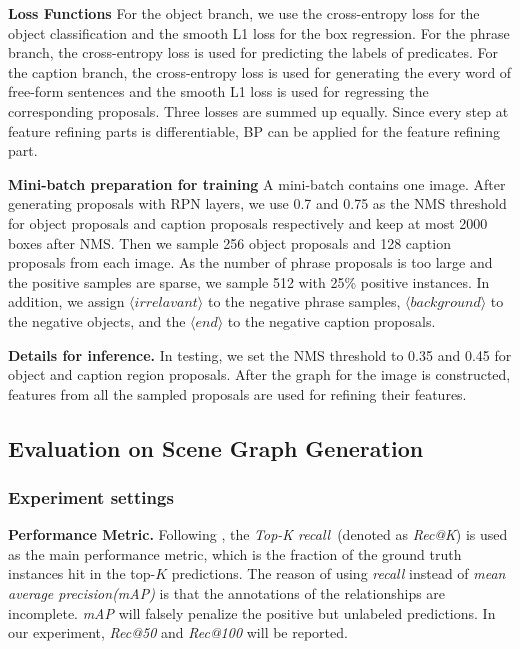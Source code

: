 \textbf{Loss Functions}
For the object branch, we use the cross-entropy loss for the object classification and the smooth L1 loss for the box regression. For the phrase branch, the cross-entropy loss is used for predicting the labels of predicates. For the caption branch, the cross-entropy loss is used for generating the every word of free-form sentences and the smooth L1 loss is used for regressing the corresponding proposals. Three losses are summed up equally. Since every step at feature refining parts is differentiable, BP can be applied for the feature refining part.

\textbf{Mini-batch preparation for training} 
A mini-batch contains one image. After generating proposals with RPN layers, we use 0.7 and 0.75 as the NMS threshold for object proposals and caption proposals respectively and keep at most 2000 boxes after NMS. Then we sample 256 object proposals and 128 caption proposals from each image. As the number of phrase proposals is too large and the positive samples are sparse, we sample 512 with 25\% positive instances. In addition, we assign $\langle irrelavant\rangle$ to the negative phrase samples, $\langle background\rangle$ to the negative objects, and the $\langle end \rangle$ to the negative caption proposals.

\textbf{Details for inference.} In testing, we set the NMS threshold to 0.35 and 0.45 for object and caption region proposals. After the graph for the image is constructed,  features from all the sampled proposals are used for refining their features.

\subsection{Evaluation on Scene Graph Generation}
\subsubsection{Experiment settings}
\label{sec:exp_setting}

\textbf{Performance Metric.} Following \cite{visual_relationship}, the \emph{Top-K recall}~(denoted as \emph{Rec@K}) is used as the main performance metric, which is the fraction of the ground truth instances hit in the top-$K$ predictions. The reason of using \emph{recall} instead of \emph{mean average precision(mAP)} is that the annotations of the relationships are incomplete. \emph{mAP} will falsely penalize the positive but unlabeled predictions. In our experiment,  \emph{Rec@50} and \emph{Rec@100} will be reported. 

